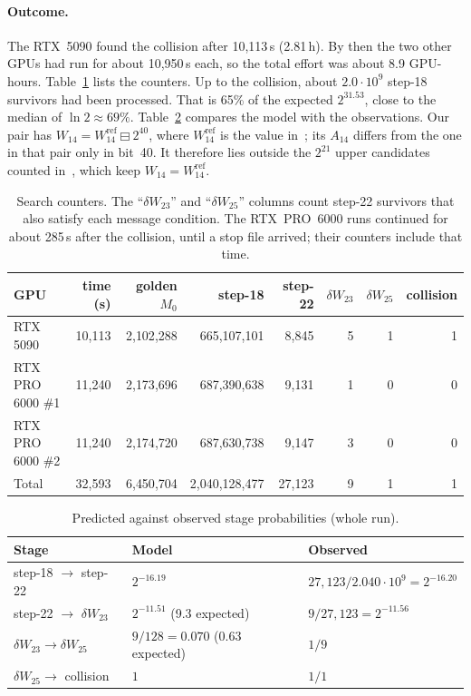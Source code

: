 \documentclass[11pt]{article}
\begin{document}
\paragraph{Outcome.} The RTX~5090 found the collision after 10{,}113\,s (2.81\,h). By then the two other GPUs had run for about 10{,}950\,s each, so the total effort was about 8.9 GPU-hours. Table~\ref{tab:stats} lists the counters. Up to the collision, about $2.0\cdot 10^9$ step-18 survivors had been processed. That is 65\% of the expected $2^{31.53}$, close to the median of $\ln 2\approx 69\%$. Table~\ref{tab:model} compares the model with the observations. Our pair has $W_{14}=W_{14}^{\mathrm{ref}}\boxminus 2^{40}$, where $W_{14}^{\mathrm{ref}}$ is the value in~\cite[Table~14]{LZLLQZ26}; its $A_{14}$ differs from the one in that pair only in bit~40. It therefore lies outside the $2^{21}$ upper candidates counted in~\cite{LZLLQZ26}, which keep $W_{14}=W_{14}^{\mathrm{ref}}$.

\begin{table}[h]
\centering
\caption{Search counters. The ``$\delta W_{23}$'' and ``$\delta W_{25}$'' columns count step-22 survivors that also satisfy each message condition. The RTX~PRO~6000 runs continued for about 285\,s after the collision, until a stop file arrived; their counters include that time.}
\label{tab:stats}
\begin{tabular}{lrrrrrrr}
\toprule
GPU & time (s) & golden $M_0$ & step-18 & step-22 & $\delta W_{23}$ & $\delta W_{25}$ & collision \\
\midrule
RTX 5090 & 10{,}113 & 2{,}102{,}288 & 665{,}107{,}101 & 8{,}845 & 5 & 1 & 1 \\
RTX PRO 6000 \#1 & 11{,}240 & 2{,}173{,}696 & 687{,}390{,}638 & 9{,}131 & 1 & 0 & 0 \\
RTX PRO 6000 \#2 & 11{,}240 & 2{,}174{,}720 & 687{,}630{,}738 & 9{,}147 & 3 & 0 & 0 \\
\midrule
Total & 32{,}593 & 6{,}450{,}704 & 2{,}040{,}128{,}477 & 27{,}123 & 9 & 1 & 1 \\
\bottomrule
\end{tabular}
\end{table}

\begin{table}[h]
\centering
\caption{Predicted against observed stage probabilities (whole run).}
\label{tab:model}
\begin{tabular}{lll}
\toprule
Stage & Model & Observed \\
\midrule
step-18 $\to$ step-22 & $2^{-16.19}$ & $27{,}123/2.040\cdot10^9 = 2^{-16.20}$ \\
step-22 $\to$ $\delta W_{23}$ & $2^{-11.51}$ (9.3 expected) & $9/27{,}123 = 2^{-11.56}$ \\
$\delta W_{23}\to\delta W_{25}$ & $9/128=0.070$ (0.63 expected) & $1/9$ \\
$\delta W_{25}\to$ collision & $1$ & $1/1$ \\
\bottomrule
\end{tabular}
\end{table}
\end{document}
